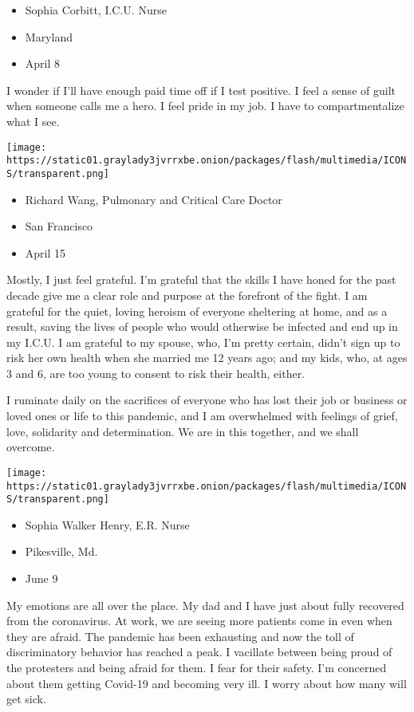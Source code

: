\begin{itemize}
\tightlist
\item
  Sophia Corbitt, I.C.U. Nurse
\item
  Maryland
\item
  April 8
\end{itemize}

I wonder if I'll have enough paid time off if I test positive. I feel a
sense of guilt when someone calls me a hero. I feel pride in my job. I
have to compartmentalize what I see.

\texttt{[image: https://static01.graylady3jvrrxbe.onion/packages/flash/multimedia/ICONS/transparent.png]}

\begin{itemize}
\tightlist
\item
  Richard Wang, Pulmonary and Critical Care Doctor
\item
  San Francisco
\item
  April 15
\end{itemize}

Mostly, I just feel grateful. I'm grateful that the skills I have honed
for the past decade give me a clear role and purpose at the forefront of
the fight. I am grateful for the quiet, loving heroism of everyone
sheltering at home, and as a result, saving the lives of people who
would otherwise be infected and end up in my I.C.U. I am grateful to my
spouse, who, I'm pretty certain, didn't sign up to risk her own health
when she married me 12 years ago; and my kids, who, at ages 3 and 6, are
too young to consent to risk their health, either.

I ruminate daily on the sacrifices of everyone who has lost their job or
business or loved ones or life to this pandemic, and I am overwhelmed
with feelings of grief, love, solidarity and determination. We are in
this together, and we shall overcome.

\texttt{[image: https://static01.graylady3jvrrxbe.onion/packages/flash/multimedia/ICONS/transparent.png]}

\begin{itemize}
\tightlist
\item
  Sophia Walker Henry, E.R. Nurse
\item
  Pikesville, Md.
\item
  June 9
\end{itemize}

My emotions are all over the place. My dad and I have just about fully
recovered from the coronavirus. At work, we are seeing more patients
come in even when they are afraid. The pandemic has been exhausting and
now the toll of discriminatory behavior has reached a peak. I vacillate
between being proud of the protesters and being afraid for them. I fear
for their safety. I'm concerned about them getting Covid-19 and becoming
very ill. I worry about how many will get sick.

